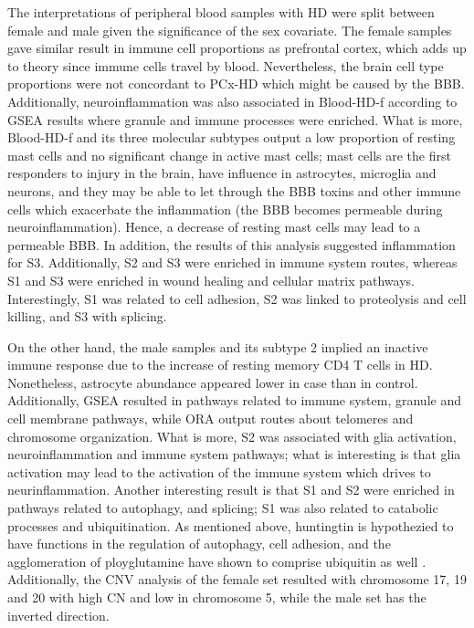 The interpretations of peripheral blood samples with HD were split between female and male given the significance of the sex covariate. The female samples gave similar result in immune cell proportions as prefrontal cortex, which adds up to theory since immune cells travel by blood. Nevertheless, the brain cell type proportions were not concordant to PCx-HD which might be caused by the BBB. Additionally, neuroinflammation was also associated in Blood-HD-f according to GSEA results where granule and immune processes were enriched. What is more, Blood-HD-f and its three molecular subtypes output a low proportion of resting mast cells and no significant change in active mast cells; mast cells are the first responders to injury in the brain, have influence in astrocytes, microglia and neurons, and they may be able to let through the BBB toxins and other immune cells which exacerbate the inflammation (the BBB becomes permeable during neuroinflammation). Hence, a decrease of resting mast cells may lead to a permeable BBB. In addition, the results of this analysis suggested inflammation for S3. Additionally, S2 and S3 were enriched in immune system routes, whereas S1 and S3 were enriched in wound healing and cellular matrix pathways. Interestingly, S1 was related to cell adhesion, S2 was linked to proteolysis and cell killing, and S3 with splicing.

On the other hand, the male samples and its subtype 2 implied an inactive immune response due to the increase of resting memory CD4 T cells in HD. Nonetheless, astrocyte abundance appeared lower in case than in control. Additionally, GSEA resulted in pathways related to immune system, granule and cell membrane pathways, while ORA output routes about telomeres and chromosome organization. What is more, S2 was associated with glia activation, neuroinflammation and immune system pathways; what is interesting is that glia activation may lead to the activation of the immune system which drives to neurinflammation. Another interesting result is that S1 and S2 were enriched in pathways related to autophagy, and splicing; S1 was also related to catabolic processes and ubiquitination. As mentioned above, huntingtin is hypothezied to have functions in the regulation of autophagy, cell adhesion, and the agglomeration of ployglutamine have shown to comprise ubiquitin as well \cite{illarioshkin}. Additionally, the CNV analysis of the female set resulted with chromosome 17, 19 and 20 with high CN and low in chromosome 5, while the male set has the inverted direction.

